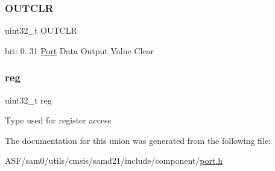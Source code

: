\subsubsection{\texorpdfstring{OUTCLR}{OUTCLR}}
{\footnotesize\ttfamily uint32\+\_\+t O\+U\+T\+C\+LR}

bit\+: 0..31 \mbox{\hyperlink{struct_port}{Port}} Data Output Value Clear \mbox{\label{union_p_o_r_t___o_u_t_c_l_r___type_a6b91636401516a477989a336376d7b40}} 
\subsubsection{\texorpdfstring{reg}{reg}}
{\footnotesize\ttfamily uint32\+\_\+t reg}

Type used for register access 

The documentation for this union was generated from the following file\+:\begin{DoxyCompactItemize}
\item 
A\+S\+F/sam0/utils/cmsis/samd21/include/component/\mbox{\hyperlink{utils_2cmsis_2samd21_2include_2component_2port_8h}{port.\+h}}\end{DoxyCompactItemize}
